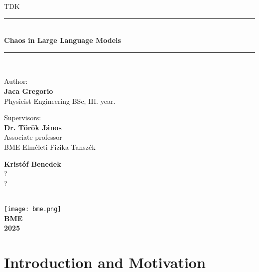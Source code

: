 \documentclass[a4paper,12pt]{article}
\begin{document}
\begin{titlepage}
\newcommand{\HRule}{\rule{\linewidth}{0.5mm}}
\center
\huge\textsc{TDK}
\HRule \\[0.4cm]
{ \huge \bfseries Chaos in Large Language Models}\\[0.2cm] 
\HRule \\[0.5cm]
\begin{minipage}[t]{0.4\textwidth}
\begin{flushleft} \large
Author: \\
\Large\textbf{Jaca Gregorio}\\
\large{Physicist Engineering BSc, III. year.}
\end{flushleft}
\end{minipage}
\qquad
\begin{minipage}[t]{0.4\textwidth}
\begin{flushleft}\large
Supervisors: \\
\Large\textbf{Dr. Török János}\\
\large Associate professor \\
BME Elméleti Fizika Tanszék

\Large\textbf{Kristóf Benedek}\\
\large ? \\
?
\end{flushleft}
\end{minipage}
\\[6cm]
\texttt{[image: bme.png]}\\[0.2cm]
\large{\textbf{BME}}\\
\large{\textbf{2025}}
\vfill
\end{titlepage}

\newpage\null\thispagestyle{empty}\newpage



\begin{abstract}
\end{abstract}
\newpage
{
  \hypersetup{linkcolor=black}
  \tableofcontents
}
\newpage

\section{Introduction and Motivation}
\end{document}
